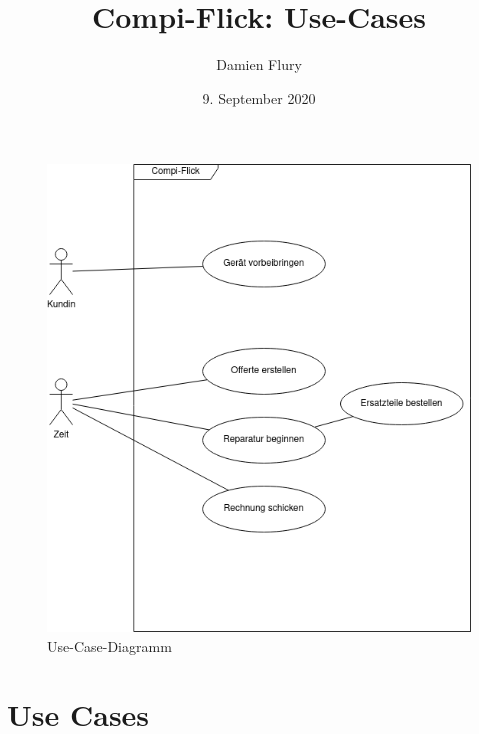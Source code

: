 \documentclass[a4paper]{scrartcl}
\title{Compi-Flick: Use-Cases}
\author{Damien Flury}
\date{9. September 2020}
\begin{document}
\maketitle
\begin{figure}
  \includegraphics[width=\textwidth]{images/compi-flick-use-case.png}
  \caption{Use-Case-Diagramm}
\end{figure}

\section{Use Cases}
\end{document}
